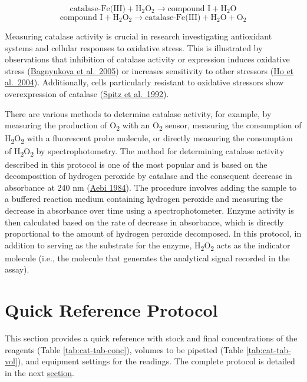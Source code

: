 \documentclass[
  9pt,
  american,
  a5paper,
  extrafontsizes,onecolumn,openright
  ]{memoir}
\begin{document}
\[
\text{catalase-Fe(III)} + \text{H}_2\text{O}_2 \rightarrow \text{compound I} + \text{H}_2\text{O}
\]
\[
\text{compound I} + \text{H}_2\text{O}_2 \rightarrow \text{catalase-Fe(III)} + \text{H}_2\text{O} + \text{O}_2
\]

Measuring catalase activity is crucial in research investigating antioxidant systems and cellular responses to oxidative stress. This is illustrated by observations that inhibition of catalase activity or expression induces oxidative stress (\href{https://doi.org/10.1016/j.brainres.2005.06.002}{Bagnyukova et al.~2005}) or increases sensitivity to other stressors (\href{https://doi.org/10.1074/jbc.m404800200}{Ho et al.~2004}). Additionally, cells particularly resistant to oxidative stressors show overexpression of catalase (\href{https://doi.org/10.1016/0003-9861(92)90071-4}{Spitz et al.~1992}).

There are various methods to determine catalase activity, for example, by measuring the production of O\textsubscript{2} with an O\textsubscript{2} sensor, measuring the consumption of H\textsubscript{2}O\textsubscript{2} with a fluorescent probe molecule, or directly measuring the consumption of H\textsubscript{2}O\textsubscript{2} by spectrophotometry. The method for determining catalase activity described in this protocol is one of the most popular and is based on the decomposition of hydrogen peroxide by catalase and the consequent decrease in absorbance at 240 nm (\href{https://doi.org/10.1016/S0076-6879(84)05016-3}{Aebi 1984}). The procedure involves adding the sample to a buffered reaction medium containing hydrogen peroxide and measuring the decrease in absorbance over time using a spectrophotometer. Enzyme activity is then calculated based on the rate of decrease in absorbance, which is directly proportional to the amount of hydrogen peroxide decomposed. In this protocol, in addition to serving as the substrate for the enzyme, H\textsubscript{2}O\textsubscript{2} acts as the indicator molecule (i.e., the molecule that generates the analytical signal recorded in the assay).

\newpage

\section{Quick Reference Protocol}\label{cat-quick-ref}

This section provides a quick reference with stock and final concentrations of the reagents (Table \ref{tab:cat-tab-conc}), volumes to be pipetted (Table \ref{tab:cat-tab-vol}), and equipment settings for the readings. The complete protocol is detailed in the next \href{@ref(\#cat_detailed_protocol)}{section}.
\end{document}
